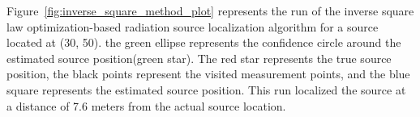 \documentclass[../report.tex]{subfiles}
\begin{document}
    Figure~\ref{fig:inverse_square_method_plot} represents the run of the inverse square law optimization-based radiation source localization algorithm for a source located at (30, 50). the green 
    ellipse represents the confidence circle around the estimated source position(green star). The red star represents the true source position, the black points represent the visited measurement points, and 
    the blue square represents the estimated source position. This run localized the source at a distance of 7.6 meters from the actual source location.

    
\end{document}
